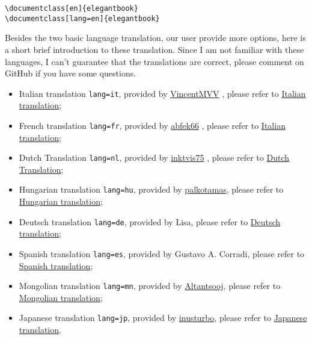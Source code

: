 \documentclass[11pt]{elegantbook}
\begin{document}
\begin{lstlisting}
\documentclass[en]{elegantbook} 
\documentclass[lang=en]{elegantbook}
\end{lstlisting}

Besides the two basic language translation, our user provide more options, here is a short brief introduction to these translation. Since I am not familiar with these languages, I can't guarantee that the translations are correct, please comment on GitHub if you have some questions.

\begin{itemize}
  \item Italian translation \lstinline{lang=it}, provided by \href{https://github.com/VincentMVV}{VincentMVV} , please refer to \href{https://github.com/ElegantLaTeX/ElegantBook/issues/85}{Italian translation};
  \item French translation \lstinline{lang=fr}, provided by \href{https://github.com/abfek66}{abfek66} , please refer to \href{https://github.com/ElegantLaTeX/ElegantBook/issues/85}{Italian translation};
  \item Dutch Translation \lstinline{lang=nl}, provided by \href{https://github.com/inktvis75}{inktvis75} , please refer to \href{https://github.com/ElegantLaTeX/ElegantBook/issues/108}{Dutch Translation};
  \item Hungarian translation \lstinline{lang=hu}, provided by \href{https://github.com/palkotamas}{palkotamas}, please refer to \href{https://github.com/ElegantLaTeX/ElegantBook/issues/111}{Hungarian translation};
  \item Deutsch translation \lstinline{lang=de}, provided by Lisa, please refer to \href{https://github.com/ElegantLaTeX/ElegantBook/issues/113}{Deutsch translation};
  \item Spanish translation \lstinline{lang=es}, provided by Gustavo A. Corradi, please refer to \href{https://github.com/ElegantLaTeX/ElegantBook/issues/133}{Spanish translation};
  \item Mongolian translation \lstinline{lang=mn}, provided by \href{https://github.com/Altantsooj}{Altantsooj}, please refer to \href{https://github.com/ElegantLaTeX/ElegantBook/issues/137}{Mongolian translation};
  \item Japanese translation \lstinline{lang=jp}, provided by \href{https://github.com/inusturbo}{inusturbo}, please refer to \href{https://github.com/ElegantLaTeX/ElegantBook/issues/172}{Japanese translation}.
\end{itemize}
\end{document}
